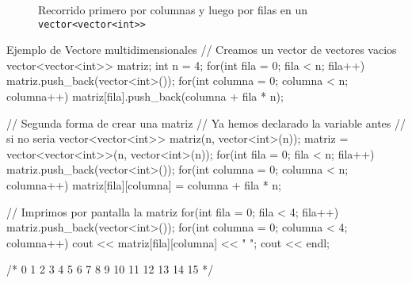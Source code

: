 \documentclass{article}
\begin{document}
    \begin{figure}[h]
        \centering
        \caption{Recorrido primero por columnas y luego por filas en un \texttt{vector<vector<int>>}}
    \end{figure}

    \begin{codelisting}{Ejemplo de Vectore multidimensionales}
// Creamos un vector de vectores vacios
vector<vector<int>> matriz;
int n = 4;
for(int fila = 0; fila < n; fila++) {
    matriz.push_back(vector<int>());
    for(int columna = 0; columna < n; columna++) {
        matriz[fila].push_back(columna + fila * n);
    }
}

// Segunda forma de crear una matriz
// Ya hemos declarado la variable antes
// si no seria vector<vector<int>> matriz(n, vector<int>(n));
matriz = vector<vector<int>>(n, vector<int>(n)); 
for(int fila = 0; fila < n; fila++) {
    matriz.push_back(vector<int>());
    for(int columna = 0; columna < n; columna++) {
        matriz[fila][columna] = columna + fila * n;
    }
}

// Imprimos por pantalla la matriz
for(int fila = 0; fila < 4; fila++) {
    matriz.push_back(vector<int>());
    for(int columna = 0; columna < 4; columna++) {
        cout << matriz[fila][columna] << " ";
    }
    cout << endl;
}

/*
    0 1 2 3 
    4 5 6 7 
    8 9 10 11 
    12 13 14 15
*/
    \end{codelisting}
 
\end{document}
